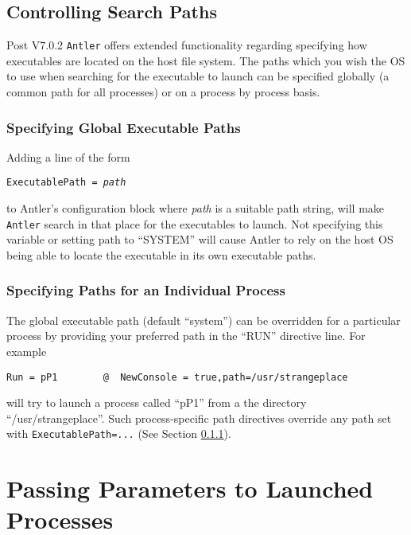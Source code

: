 \documentclass[a4paper,10pt]{article}
\newcommand{\Code}[1]{\texttt{#1} }
\newcommand{\code}[1]{\Code{#1} }
\begin{document}
\subsection{Controlling Search Paths}

Post V7.0.2 \code{Antler} offers extended functionality regarding specifying how executables are located on the host file system. The paths which you wish the OS to use when searching for the executable to launch can be specified globally (a common path for all processes) or on a process by process basis.

\subsubsection{Specifying Global Executable Paths}\label{Sec:ExecPath}

Adding a line of the form
\begin{center}
\code{ExecutablePath = {\it{path}}}
\end{center}
to Antler's configuration block where {\it{path}} is a suitable path string, will make \code{Antler} search in that place for the executables  to launch. Not specifying this variable or setting path to ``SYSTEM'' will  cause Antler to rely on the host OS being able to locate the executable in its own executable paths.

\subsubsection{Specifying Paths for an Individual Process}

The global executable path (default ``system'') can be overridden for a particular process by providing your preferred path in the ``RUN'' directive line. For example
\begin{lstlisting}
Run = pP1        @  NewConsole = true,path=/usr/strangeplace
\end{lstlisting}

will try to launch a process called ``pP1'' from a the directory ``/usr/strangeplace''.  Such process-specific path directives override any path set with \code{ExecutablePath=...} (See Section \ref{Sec:ExecPath}).

\section{Passing Parameters to Launched Processes}\label{Sec:ExeParameters}
\end{document}
